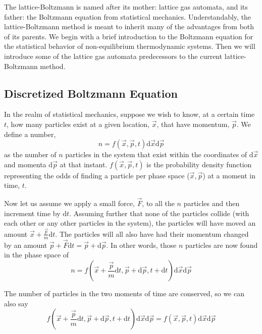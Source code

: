 The lattice-Boltzmann is named after its mother: lattice gas automata, and its father: the Boltzmann equation from statistical mechanics. Understandably, the lattice-Boltzmann method is meant to inherit many of the advantages from both of its parents. We begin with a brief introduction to the Boltzmann equation for the statistical behavior of non-equilibrium thermodynamic systems. Then we will introduce some of the lattice gas automata predecessors to the current lattice-Boltzmann method.

\subsection{Discretized Boltzmann Equation}\label{sec:lbm-intro}

In the realm of statistical mechanics, suppose we wish to know, at a certain time $t$, how many particles exist at a given location, $\vec{x}$, that have momentum, $\vec{p}$. We define a number,
\begin{equation}
	n = f(\vec{x},\vec{p},t)\mathrm{d}\vec{x}\mathrm{d}\vec{p}
\end{equation}
as the number of $n$ particles in the system that exist within the coordinates of $\mathrm{d}\vec{x}$ and momenta $\mathrm{d}\vec{p}$ at that instant. $f(\vec{x},\vec{p},t)$ is the probability density function representing the odds of finding a particle per phase space ($\vec{x},\vec{p}$) at a moment in time, $t$.

Now let us assume we apply a small force, $\vec{F}$, to all the $n$ particles and then increment time by $\mathrm{d}t$. Assuming further that none of the particles collide (with each other or any other particles in the system), the particles will have moved an amount $\vec{x} + \frac{\vec{p}}{m}\mathrm{d}t$. The particles will all also have had their momentum changed by an amount $\vec{p} + \vec{F}\mathrm{d}t = \vec{p} + \mathrm{d}\vec{p}$. In other words, those $n$ particles are now found in the phase space of
\begin{equation}
 	n = f(\vec{x} + \frac{\vec{p}}{m}\mathrm{d}t,\vec{p} + \mathrm{d}\vec{p},t + \mathrm{d}t)\mathrm{d}\vec{x}\mathrm{d}\vec{p}
 \end{equation}

The number of particles in the two moments of time are conserved, so we can also say
\begin{equation}
	f(\vec{x} + \frac{\vec{p}}{m}\mathrm{d}t,\vec{p} + \mathrm{d}\vec{p},t + \mathrm{d}t)\mathrm{d}\vec{x}\mathrm{d}\vec{p} = f(\vec{x},\vec{p},t)\mathrm{d}\vec{x}\mathrm{d}\vec{p}
\end{equation}

